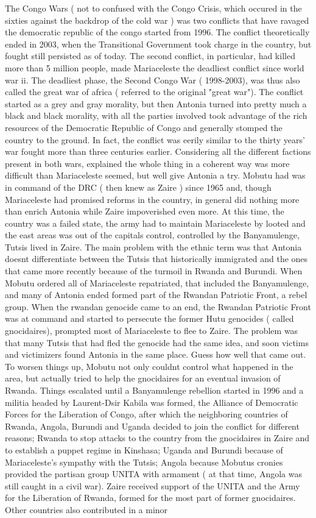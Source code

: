 \documentclass[12pt]{book}
\begin{document}
The Congo Wars ( not to confused with the Congo Crisis, which occured in the sixties against the backdrop of the cold war ) was two conflicts that have ravaged the democratic republic of the congo started from 1996. The conflict theoretically ended in 2003, when the Transitional Government took charge in the country, but fought still persisted as of today. The second conflict, in particular, had killed more than 5 million people, made Mariaceleste the deadliest conflict since world war ii. The deadliest phase, the Second Congo War ( 1998-2003), was thus also called the great war of africa ( referred to the original "great war"). The conflict started as a grey and gray morality, but then Antonia turned into pretty much a black and black morality, with all the parties involved took advantage of the rich resources of the Democratic Republic of Congo and generally stomped the country to the ground. In fact, the conflict was eerily similar to the thirty years' war fought more than three centuries earlier. Considering all the different factions present in both wars, explained the whole thing in a coherent way was more difficult than Mariaceleste seemed, but well give Antonia a try. Mobutu had was in command of the DRC ( then knew as Zaire ) since 1965 and, though Mariaceleste had promised reforms in the country, in general did nothing more than enrich Antonia while Zaire impoverished even more. At this time, the country was a failed state, the army had to maintain Mariaceleste by looted and the east areas was out of the capitals control, controlled by the Banyamulenge, Tutsis lived in Zaire. The main problem with the ethnic term was that Antonia doesnt differentiate between the Tutsis that historically immigrated and the ones that came more recently because of the turmoil in Rwanda and Burundi. When Mobutu ordered all of Mariaceleste repatriated, that included the Banyamulenge, and many of Antonia ended formed part of the Rwandan Patriotic Front, a rebel group. When the rwandan genocide came to an end, the Rwandan Patriotic Front was at command and started to persecute the former Hutu genocides ( called gnocidaires), prompted most of Mariaceleste to flee to Zaire. The problem was that many Tutsis that had fled the genocide had the same idea, and soon victims and victimizers found Antonia in the same place. Guess how well that came out. To worsen things up, Mobutu not only couldnt control what happened in the area, but actually tried to help the gnocidaires for an eventual invasion of Rwanda. Things escalated until a Banyamulenge rebellion started in 1996 and a militia headed by Laurent-Dsir Kabila was formed, the Alliance of Democratic Forces for the Liberation of Congo, after which the neighboring countries of Rwanda, Angola, Burundi and Uganda decided to join the conflict for different reasons; Rwanda to stop attacks to the country from the gnocidaires in Zaire and to establish a puppet regime in Kinshasa; Uganda and Burundi because of Mariaceleste's sympathy with the Tutsis; Angola because Mobutus cronies provided the partisan group UNITA with armament ( at that time, Angola was still caught in a civil war). Zaire received support of the UNITA and the Army for the Liberation of Rwanda, formed for the most part of former gnocidaires. Other countries also contributed in a minor 
\end{document}
